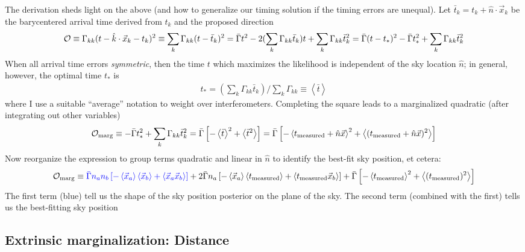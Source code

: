 \documentclass[twocolumn,prd,nofootinbib]{revtex4}
\begin{document}
\begin{widetext}
\begin{shaded}
The derivation sheds light on the above (and how to generalize our timing solution if the timing errors are unequal).
Let $\bar{t}_k = t_k+\hat{n}\cdot \vec{x}_k$ be the barycentered arrival time derived from $t_k$ and the proposed direction
\begin{eqnarray}
{\cal O}\equiv \Gamma_{kk}(t-\hat{k}\cdot \vec{x}_k -t_k)^2 \equiv \sum_k\Gamma_{kk}(t-\bar{t}_k)^2 
= \bar{\Gamma} t^2 - 2 (\sum_k \Gamma_{kk} \bar{t}_k)t + \sum_k \Gamma_{kk}\bar{t}_k^2 
= \bar{\Gamma}(t-t_*)^2 - \bar{\Gamma} t_*^2  + \sum_k \Gamma_{kk}\bar{t}_k^2 
\end{eqnarray}
When all arrival time errors  \emph{symmetric}, then the time $t$ which maximizes the likelihood is  independent of the
sky location $\hat{n}$; in general, however, the optimal time $t_*$ is
\begin{eqnarray}
t_*  = (\sum_k \Gamma_{kk} \bar{t}_k)/\sum_k \Gamma_{kk} \equiv \left<\bar{t}\right>
\end{eqnarray}
where I use a suitable ``average'' notation to weight over interferometers. 
Completing the square leads to a marginalized quadratic (after integrating out other variables)
\begin{eqnarray}
{\cal O}_{\rm marg}\equiv - \bar{\Gamma} t_*^2  + \sum_k \Gamma_{kk}\bar{t}_k^2  
 = \bar{\Gamma}\left[ -\left<\bar{t}\right>^2 + \left<\bar{t}^2 \right> \right]
 = \bar{\Gamma}\left[ -\left<t_{\rm measured}+\hat{n}\vec{x}\right>^2 + \left<(t_{\rm measured}+\hat{n}\vec{x})^2
  \right>
 \right]
\end{eqnarray}
Now reorganize the expression to group terms quadratic and linear in $\hat{n}$ to identify the best-fit sky position, et
cetera:
\begin{eqnarray}
{\cal O}_{\rm marg} \equiv 
{\color{blue}\bar{\Gamma}n_a n_b \left[
   -\left<\vec{x}_a\right>\left<\vec{x}_b\right> + \left<\vec{x}_a \vec{x}_b\right>
 \right]
}
+{ 2 \bar{\Gamma}n_a  \left[
   -\left<\vec{x}_a \right>\left<t_{\rm measured}\right> + \left< t_{\rm measured} \vec{x}_b\right>
 \right]
}
+  \bar{\Gamma}  \left[
 -\left<t_{\rm measured}\right>^2 + \left<(t_{\rm measured})^2 \right>
 \right]
\end{eqnarray}
The first  term (blue) tell us the shape of the sky position posterior on the plane of the sky.  The second term
(combined with the first) tells us the best-fitting sky position
\end{shaded}

\subsection{Extrinsic marginalization: Distance }


\end{widetext}
\end{document}
